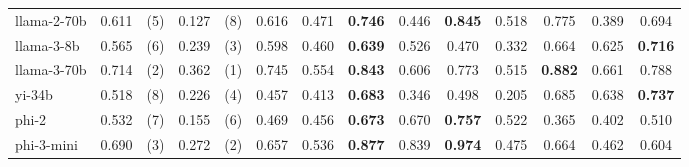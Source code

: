 \begin{tabular}{
    @{}lllllccccccccc@{}
    }
    llama-2-70b    & 0.611                       & (5)                             & 0.127                        & (8)                               & 0.616          & 0.471                                   & \textbf{0.746}            & 0.446                     & \textbf{0.845}                           & 0.518                      & 0.775                      & 0.389          & 0.694          \\
    llama-3-8b     & 0.565                       & (6)                             & 0.239                        & (3)                               & 0.598          & 0.460                                   & \textbf{0.639}            & 0.526                     & 0.470                                    & 0.332                      & 0.664                      & 0.625          & \textbf{0.716} \\
    llama-3-70b    & 0.714                       & (2)                             & 0.362                        & (1)                               & 0.745          & 0.554                                   & \textbf{0.843}            & 0.606                     & 0.773                                    & 0.515                      & \textbf{0.882}             & 0.661          & 0.788          \\
    yi-34b         & 0.518                       & (8)                             & 0.226                        & (4)                               & 0.457          & 0.413                                   & \textbf{0.683}            & 0.346                     & 0.498                                    & 0.205                      & 0.685                      & 0.638          & \textbf{0.737} \\
    phi-2          & 0.532                       & (7)                             & 0.155                        & (6)                               & 0.469          & 0.456                                   & \textbf{0.673}            & 0.670                     & \textbf{0.757}                           & 0.522                      & 0.365                      & 0.402          & 0.510          \\
    phi-3-mini     & 0.690                       & (3)                             & 0.272                        & (2)                               & 0.657          & 0.536                                   & \textbf{0.877}            & 0.839                     & \textbf{0.974}                           & 0.475                      & 0.664                      & 0.462          & 0.604          \\

\end{tabular}
